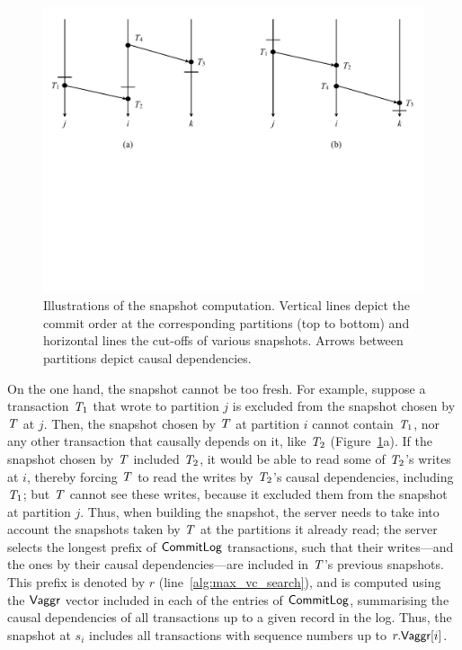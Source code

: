 \begin{figure}[t]
\vspace{-0.5cm}
\includegraphics[width=\textwidth]{figures/ch4_snapshot.pdf}
\vspace{-6.5cm}
\caption{Illustrations of the snapshot computation. Vertical lines depict the
  commit order at the corresponding partitions (top to bottom) and horizontal
  lines the cut-offs of various snapshots. Arrows between partitions depict
  causal dependencies.}
\label{fig:snapshot}
\end{figure}

On the one hand, the snapshot cannot be too fresh. For example, suppose a transaction $\mathit{T}_1$ that wrote to partition $j$ is excluded from the snapshot chosen by $\mathit{T}$ at $j$. Then, the snapshot chosen by $\mathit{T}$ at partition $i$ cannot contain $\mathit{T}_1$, nor any other transaction that causally depends on it, like $\mathit{T}_2$ (Figure~\ref{fig:snapshot}a). If the snapshot chosen by $\mathit{T}$ included $\mathit{T}_2$, it would be able to read some of $\mathit{T}_2$'s writes at $i$, thereby forcing $\mathit{T}$ to read the writes by $\mathit{T}_2$'s causal dependencies, including $\mathit{T}_1$; but $\mathit{T}$ cannot see these writes, because it excluded them from the snapshot at partition $j$. Thus, when building the snapshot, the server needs to take into account the snapshots taken by $\mathit{T}$ at the partitions it already read; the server selects the longest prefix of $\mathsf{CommitLog}$ transactions, such that their writes---and the ones by their causal dependencies---are included in $\mathit{T}$'s previous snapshots. This prefix is denoted by $r$ (line~\ref{alg:max_vc_search}), and is computed using the $\mathsf{Vaggr}$ vector included in each of the entries of $\mathsf{CommitLog}$, summarising the causal dependencies of all transactions up to a given record in the log. Thus, the snapshot at $s_i$ includes all transactions with sequence numbers up to $r.\mathsf{Vaggr}[i]$.

